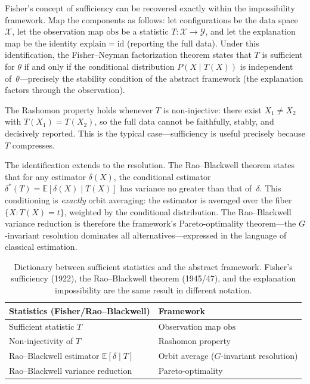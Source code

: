 \documentclass[11pt,a4paper]{article}
\newcommand{\E}{\mathbb{E}}
\begin{document}
Fisher's concept of sufficiency \citep{fisher1922mathematical} can be
recovered exactly within the impossibility framework.  Map the components as
follows: let configurations be the data space~$\mathcal{X}$, let the
observation map $\mathrm{obs}$ be a statistic $T\colon \mathcal{X} \to
\mathcal{Y}$, and let the explanation map be the identity $\mathrm{explain} =
\mathrm{id}$ (reporting the full data).  Under this identification, the
Fisher--Neyman factorization theorem \citep{neyman1935su} states that $T$ is
sufficient for $\theta$ if and only if the conditional distribution
$P(X \mid T(X))$ is independent of~$\theta$---precisely the stability
condition of the abstract framework (the explanation factors through the
observation).

The Rashomon property holds whenever $T$ is non-injective: there exist
$X_1 \neq X_2$ with $T(X_1) = T(X_2)$, so the full data cannot be
faithfully, stably, and decisively reported.  This is the typical
case---sufficiency is useful precisely because $T$ compresses.

The identification extends to the resolution.  The Rao--Blackwell theorem
\citep{rao1945information, blackwell1947conditional} states that for any
estimator $\delta(X)$, the conditional estimator
$\delta^*(T) = \E[\delta(X) \mid T(X)]$ has variance no greater than that
of~$\delta$.  This conditioning is \emph{exactly} orbit averaging: the
estimator is averaged over the fiber $\{X : T(X) = t\}$, weighted by the
conditional distribution.  The Rao--Blackwell variance reduction is therefore
the framework's Pareto-optimality theorem---the $G$-invariant resolution
dominates all alternatives---expressed in the language of classical
estimation.

\begin{table}[t]
  \centering
  \small
  \begin{tabular}{@{}ll@{}}
    \toprule
    \textbf{Statistics (Fisher/Rao--Blackwell)} & \textbf{Framework} \\
    \midrule
    Sufficient statistic $T$ & Observation map $\mathrm{obs}$ \\
    Non-injectivity of $T$ & Rashomon property \\
    Rao--Blackwell estimator $\E[\delta \mid T]$ & Orbit average ($G$-invariant resolution) \\
    Rao--Blackwell variance reduction & Pareto-optimality \\
    \bottomrule
  \end{tabular}
  \caption{Dictionary between sufficient statistics and the abstract framework.
    Fisher's sufficiency (1922), the Rao--Blackwell theorem (1945/47), and the
    explanation impossibility are the same result in different notation.}
  \label{tab:sufficiency-dictionary}
\end{table}
\end{document}
